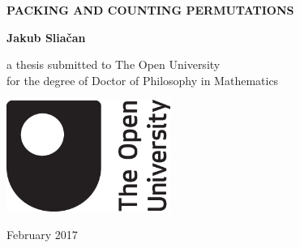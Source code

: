 \begin{titlepage}
    \begin{center}
        \vspace*{1cm}
        
        \Huge
        \textbf{PACKING AND COUNTING PERMUTATIONS}
        
        \vspace{1.5cm}
        
        \textbf{Jakub Slia\v{c}an}
        
        \vfill
        
        \Large a thesis submitted to The Open University\\
        for the degree of Doctor of Philosophy in Mathematics
        
        \vspace{0.8cm}
        
        \includegraphics[width=0.4\textwidth]{figs/oulogo.jpg}
        
        \vspace{0.8cm}

        \Large
        February 2017
        
    \end{center}
\end{titlepage}